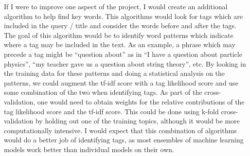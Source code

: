 \documentclass{article}
\begin{document}
If I were to improve one aspect of the project, I would create an additional
algorithm to help find key words. This algorithms would look for tags which
are included in the query / title and consider the words before and 
after the tags. The goal of this algorithm would be to identify word
patterns which indicate where a tag may be included in the text. As an
example, a phrase which may precede a tag might be ``question about'' as in
``I have a question about particle physics'', ``my teacher gave us a question
about string theory'', etc. By looking in the training data for these patterns
and doing a statistical analysis on the patterns, we could augment the tf-idf
score with a tag likelihood score and use some combination of the two when
identifying tags. As part of the cross-validation, one would need to obtain
weights for the relative contributions of the tag likelihood score and the
tf-idf score. This could be done using k-fold cross-validation by holding out
one of the training topics, although it would be more computationally
intensive. I would expect that this combination of algorithms would do a
better job of identifying tags, as most ensembles of machine learning models
work better than individual models on their own. 


\end{document}

